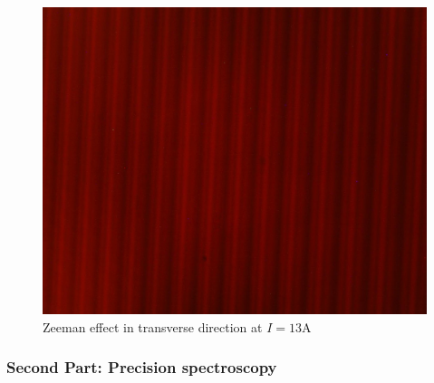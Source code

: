 \begin{figure}[ht]
\centering
\includegraphics[scale=.15]{images//interference.jpg}
\caption{Zeeman effect in transverse direction at $I=13$A}
\label{fig:interference}
\end{figure}

\subsubsection{Second Part: Precision spectroscopy}